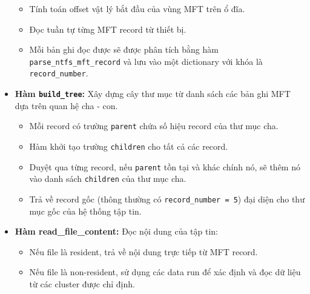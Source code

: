 \begin{itemize}
\begin{itemize}
    \item Tính toán offset vật lý bắt đầu của vùng MFT trên ổ đĩa.
    \item Đọc tuần tự từng MFT record từ thiết bị.
    \item Mỗi bản ghi đọc được sẽ được phân tích bằng hàm \texttt{parse\_ntfs\_mft\_record} và lưu vào một dictionary với khóa là \texttt{record\_number}.
\end{itemize}
\item \textbf{Hàm \texttt{build\_tree}:}  
Xây dựng cây thư mục từ danh sách các bản ghi MFT dựa trên quan hệ cha - con.
\begin{itemize}
    \item Mỗi record có trường \texttt{parent} chứa số hiệu record của thư mục cha.
    \item Hàm khởi tạo trường \texttt{children} cho tất cả các record.
    \item Duyệt qua từng record, nếu \texttt{parent} tồn tại và khác chính nó, sẽ thêm nó vào danh sách \texttt{children} của thư mục cha.
    \item Trả về record gốc (thông thường có \texttt{record\_number = 5}) đại diện cho thư mục gốc của hệ thống tập tin.
\end{itemize}
    \item \textbf{Hàm read\_file\_content:} Đọc nội dung của tập tin:
    \begin{itemize}
        \item Nếu file là resident, trả về nội dung trực tiếp từ MFT record.
        \item Nếu file là non-resident, sử dụng các data run để xác định và đọc dữ liệu từ các cluster được chỉ định.
    \end{itemize}
\end{itemize}
